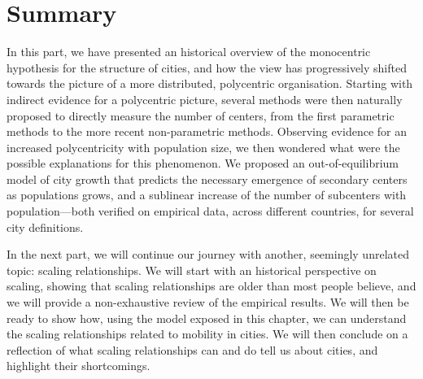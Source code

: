 \section{Summary}
\label{sec:summary}


In this part, we have presented an historical overview of the monocentric
hypothesis for the structure of cities, and how the view has progressively
shifted towards the picture of a more distributed, polycentric organisation.
Starting with indirect evidence for a polycentric picture, several methods were
then naturally proposed to directly measure the number of centers, from the
first parametric methods to the more recent non-parametric methods. Observing
evidence for an increased polycentricity with population size, we then wondered
what were the possible explanations for this phenomenon. We proposed an
out-of-equilibrium model of city growth that predicts the necessary emergence of
secondary centers as populations grows, and a sublinear increase of the number
of subcenters with population---both verified on empirical data, across
different countries, for several city definitions.

In the next part, we will continue our journey with another, seemingly unrelated
topic: scaling relationships. We will start with an historical perspective on
 scaling, showing that scaling relationships are older than most people believe,
 and we will provide a non-exhaustive review of the empirical results. We will
 then be ready to show how, using the model exposed in this chapter, we can
 understand the scaling relationships related to mobility in cities. We will
 then conclude on a reflection of what scaling relationships can and do tell us about cities,
 and highlight their shortcomings.



